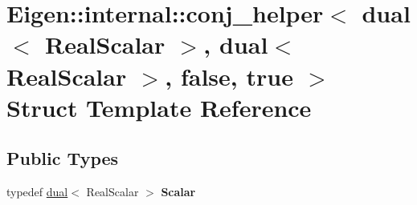 \hypertarget{struct_eigen_1_1internal_1_1conj__helper_3_01dual_3_01_real_scalar_01_4_00_01dual_3_01_real_scal4b61c34ae29b604821accd0f1246383c}{\section{Eigen\-:\-:internal\-:\-:conj\-\_\-helper$<$ dual$<$ Real\-Scalar $>$, dual$<$ Real\-Scalar $>$, false, true $>$ Struct Template Reference}
\label{struct_eigen_1_1internal_1_1conj__helper_3_01dual_3_01_real_scalar_01_4_00_01dual_3_01_real_scal4b61c34ae29b604821accd0f1246383c}
}
\subsection*{Public Types}
\begin{DoxyCompactItemize}
\item 
\hypertarget{struct_eigen_1_1internal_1_1conj__helper_3_01dual_3_01_real_scalar_01_4_00_01dual_3_01_real_scal4b61c34ae29b604821accd0f1246383c_a333b388ae291c28d3fa31188bdf03ee6}{typedef \hyperlink{struct_d_r_d_s_p_1_1dual}{dual}$<$ Real\-Scalar $>$ {\bfseries Scalar}}\label{struct_eigen_1_1internal_1_1conj__helper_3_01dual_3_01_real_scalar_01_4_00_01dual_3_01_real_scal4b61c34ae29b604821accd0f1246383c_a333b388ae291c28d3fa31188bdf03ee6}

\end{DoxyCompactItemize}

